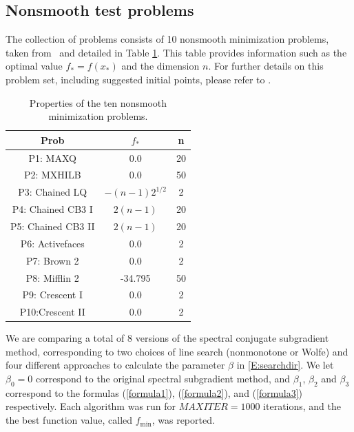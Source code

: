 \documentclass[]{interact}
\theoremstyle{plain}%
\theoremstyle{definition}
\theoremstyle{remark}
\begin{document}
\subsection{Nonsmooth test problems}
\label{sec:5.1}

{The collection of problems consists of 10 nonsmooth minimization problems, taken from~\cite{Napsu07} and detailed in Table \ref{table:tst14}. This table provides information such as the optimal value $f_* = f(x_*)$ and the dimension $n$. For further details on this problem set, including suggested initial points, please refer to \cite{Napsu07}.}

\begin{table}[htbp]
\centering
\caption{Properties of the ten nonsmooth minimization problems.}
\label{table:tst14}
\footnotesize
\begin{tabular}{|c|c|c|}\hline
Prob                 & $f_*$             & n   \\\hline \hline
 P1: MAXQ            & 0.0               & 20             \\
 P2: MXHILB          & 0.0               & 50      \\
 P3: Chained LQ      & $-(n-1)2^{1/2}$    & 2              \\
 P4: Chained CB3 I   & $2(n-1)$          & 20             \\
 P5: Chained CB3 II  & $2(n-1)$          & 20              \\
 P6: Activefaces     & 0.0               & 2             \\
 P7: Brown 2         & 0.0               & 2              \\
 P8: Mifflin 2       & -34.795           & 50              \\
 P9: Crescent I      & 0.0               & 2                \\
 P10:Crescent II     & 0.0               & 2                \\ \hline
\end{tabular}

\end{table}

We are comparing a total of 8 versions of the spectral conjugate subgradient method, corresponding to two choices of line search (nonmonotone or Wolfe) and four different approaches to calculate the parameter $\beta$ in \eqref{E:searchdir}. We let $\beta_0=0$ correspond to the original spectral subgradient method, and $\beta_1$, $\beta_2$ and $\beta_3$ correspond to the formulas (\ref{formula1}), (\ref{formula2}), and (\ref{formula3}) respectively. Each algorithm was run for $MAXITER = 1000$ iterations, and the the best function value, called $f_{\min}$, was reported.
\end{document}
